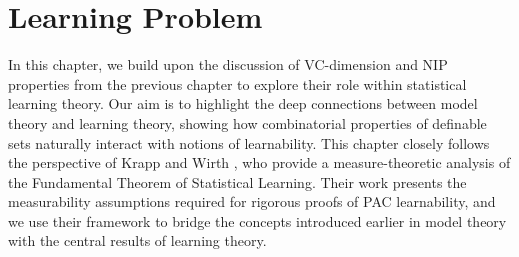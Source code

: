 \chapter{Learning Problem}

In this chapter, we build upon the discussion of VC-dimension and NIP properties from the previous chapter to explore their role within statistical learning theory. Our aim is to highlight the deep connections between model theory and learning theory, showing how combinatorial properties of definable sets naturally interact with notions of learnability. This chapter closely follows the perspective of Krapp and Wirth \cite{KrappWirth2021}, who provide a measure-theoretic analysis of the Fundamental Theorem of Statistical Learning. Their work presents the measurability assumptions required for rigorous proofs of PAC learnability, and we use their framework to bridge the concepts introduced earlier in model theory with the central results of learning theory.




